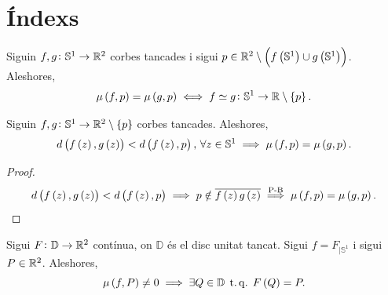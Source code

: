 \section{Índexs}

\begin{teo*}
    Siguin $f, g \colon \mathbb{S}^1 \to \mathbb{R} ^2$ corbes tancades i sigui $p\in \mathbb{R}^2 \setminus \left( f\left( \mathbb{S}^1\right) \cup g\left( \mathbb{S}^1\right)\right)$. Aleshores,
    \[
        \mu \left( f, p\right) = \mu\left( g, p \right) \iff f \simeq g  \colon \mathbb{S}^1 \to \mathbb{R} \setminus \left\{ p \right\}.
    \]
\end{teo*}

\begin{teo*}
    Siguin $f, g \colon \mathbb{S}^1 \to \mathbb{R} ^2 \setminus \left\{ p \right\}$ corbes tancades. Aleshores,
    \[
        d \left( f \left( z \right), g \left( z \right) \right) < d \left( f \left( z \right), p \right), \, \forall z\in \mathbb{S}^1 \implies \mu \left( f, p\right) = \mu\left( g, p \right).
    \]
    
\end{teo*}
\begin{proof}
    \[
        d \left( f \left( z \right), g \left( z \right) \right) < d \left( f \left( z \right), p \right) \implies p \notin \overline{f\left( z \right) g \left( z \right)} \stackrel{\text{P-B}}{\implies} \mu \left( f, p\right) = \mu\left( g, p \right).
    \]
\end{proof}
\begin{teo*}
	Sigui $F\colon \mathbb{D} \to \mathbb{R} ^2$ contínua, on $\mathbb{D}$ és el disc unitat tancat. Sigui $f=F_{|\mathbb{S}^1}$ i sigui $P \in \mathbb{R} ^2$. Aleshores,
	\[
		\mu\left( f, P \right) \neq 0 \implies \exists Q \in \mathbb{D} \operatorname{\;t.q.\;} F\left( Q \right) = P.
	\]
\end{teo*}

